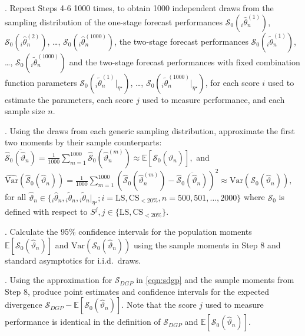 \documentclass[12pt]{article}
\theoremstyle{definition}
\theoremstyle{remark}
\begin{document}
\medskip

. Repeat Steps 4-6 1000 times, to obtain 1000 independent draws from the sampling distribution of the one-stage forecast performances $\mathcal{S}_0({}_i \hat{\theta}^{(1)}_n)$, $\mathcal{S}_0({}_i \hat{\theta}^{(2)}_n)$, \ldots, $\mathcal{S}_0({}_i \hat{\theta}^{(1000)}_n)$, the two-stage forecast performances $\mathcal{S}_0({}_i \tilde{\theta}^{(1)}_n)$, \ldots, $\mathcal{S}_0({}_i \tilde{\theta}^{(1000)}_n)$ and the two-stage forecast performances with fixed combination function parameters $\mathcal{S}_0({}_i \tilde{\theta}^{(1)}_n|_{\eta^{\star}})$, \ldots, $\mathcal{S}_0({}_i \tilde{\theta}^{(1000)}_n|_{\eta^{\star}})$, for each score $i$ used to estimate the parameters, each score $j$ used to measure performance, and each sample size $n$.

\medskip

. Using the draws from each generic sampling distribution, approximate the first two moments by their sample counterparts: $\overline{\hat{\mathcal{S}}_0(\hat{\vartheta}_n)} = \frac{1}{1000} \sum_{m = 1}^{1000} \hat{\mathcal{S}}_0(\hat{\vartheta}^{(m)}_n) \approx \mathbb{E}[\mathcal{S}_0(\hat{\vartheta}_n)], $ and $\widehat{\mathrm{Var}}(\hat{\mathcal{S}}_0(\hat{\vartheta}_n)) = \frac{1}{1000} \sum_{m = 1}^{1000} \left( \hat{\mathcal{S}}_0(\hat{\vartheta}^{(m)}_n) - \overline{\hat{\mathcal{S}}_0(\hat{\vartheta}_n)} \right)^2 \approx \mathrm{Var}(\mathcal{S}_0(\hat{\vartheta}_n)),$ for all $\hat{\vartheta}_n \in \{{}_i\hat{\theta}_n, {}_i\tilde{\theta}_n, {}_i\tilde{\theta}_n|_{\eta^{\star}} ;\allowbreak i = \mathrm{LS}, \mathrm{CS}_{<20\%}, n = 500, 501, \ldots, 2000\}$ where $\mathcal{S}_0$ is defined with respect to $S^j, j \in \{\mathrm{LS}, \mathrm{CS}_{<20\%}\}$.

\medskip

. Calculate the 95\% confidence intervals for the population moments $\mathbb{E}[\mathcal{S}_0(\hat{\vartheta}_n)]$ and $\mathrm{Var}(\mathcal{S}_0(\hat{\vartheta}_n))$ using the sample moments in Step 8 and standard asymptotics for i.i.d.\ draws.

\medskip

. Using the approximation for $\mathcal{S}_{DGP}$ in \eqref{eqn:sdgp} and the sample moments from Step 8, produce point estimates and confidence intervals for the expected divergence $\mathcal{S}_{DGP} - \mathbb{E}[\mathcal{S}_0(\hat{\vartheta}_n)]$. Note that the score $j$ used to measure performance is identical in the definition of $\mathcal{S}_{DGP}$ and $\mathbb{E}[\mathcal{S}_0(\hat{\vartheta}_n)]$.
\end{document}
